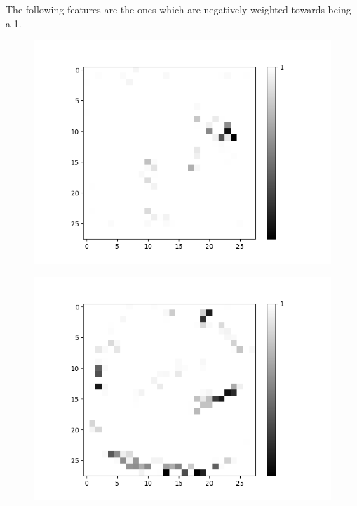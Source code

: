 The following features are the ones which are negatively weighted towards being a 1. 

\begin{figure}[H]

	\centering
	\begin{minipage}[b]{0.19\textwidth}
		\captionsetup{labelformat=empty}
		\includegraphics[width=\textwidth]{OR-AND(W-LSM)(1)/DontLike/True/Layer0-Neuron-2.png}
		\label{}
	\end{minipage}
	\begin{minipage}[b]{0.19\textwidth}
		\captionsetup{labelformat=empty}
		\includegraphics[width=\textwidth]{OR-AND(W-LSM)(1)/DontLike/True/Layer0-Neuron-9.png}

\end{minipage}
\end{figure}
